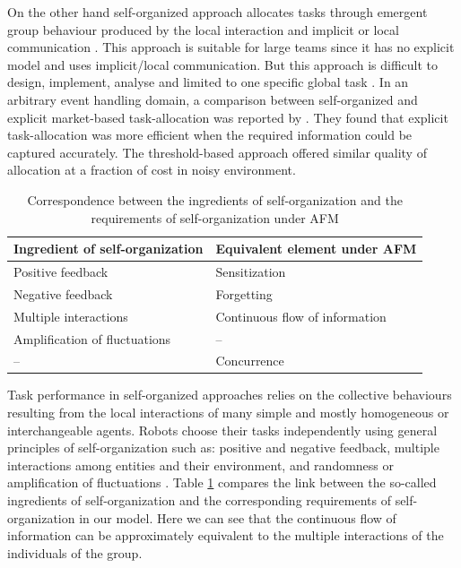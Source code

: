 \documentclass[smallcondensed]{svjour3}
\begin{document}
On the other hand self-organized approach allocates tasks through emergent group behaviour produced by the local interaction and implicit or local communication \citep{Bonabeau+1999}. This approach is suitable for large teams since it has no explicit model and uses implicit/local communication. But this approach is difficult to design, implement, analyse and limited to one specific global task \citep{Gerkey+2004}. In an arbitrary event handling domain, a comparison between self-organized and explicit market-based task-allocation was reported by \citep{kalra+2007}. They found that explicit task-allocation was more efficient when the required information could be captured accurately. The threshold-based approach offered similar quality of allocation at a fraction of cost in noisy environment. 
\begin{table}
\label{table:so-afm}
\caption{Correspondence between the ingredients of self-organization and the requirements of self-organization under AFM}
\begin{center}
\begin{tabular}{|p{1.2in}|p{1.2in}|}
\hline  Ingredient of \protect\newline self-organization & Equivalent element under AFM \\ 
\hline Positive feedback &  Sensitization\\ 
\hline Negative feedback &  Forgetting\\ 
\hline Multiple interactions &  Continuous flow \protect\newline of information\\ 
\hline Amplification of fluctuations & -- \\ 
\hline  -- &  Concurrence\\ 
\hline 
\end{tabular} 
\end{center}
\end{table}
Task performance in self-organized approaches relies on the collective behaviours resulting from the local interactions of many simple and mostly homogeneous or interchangeable agents. Robots choose their tasks independently using general principles of self-organization such as: positive and negative feedback, multiple interactions among entities and their environment, and randomness or amplification of fluctuations \citep{Camazine+2001}. Table \ref{table:so-afm} compares the link between the so-called ingredients of self-organization and the corresponding requirements of self-organization in our model. Here we can see that the continuous flow of information can be approximately equivalent to the multiple interactions of the individuals of the group.
\end{document}
